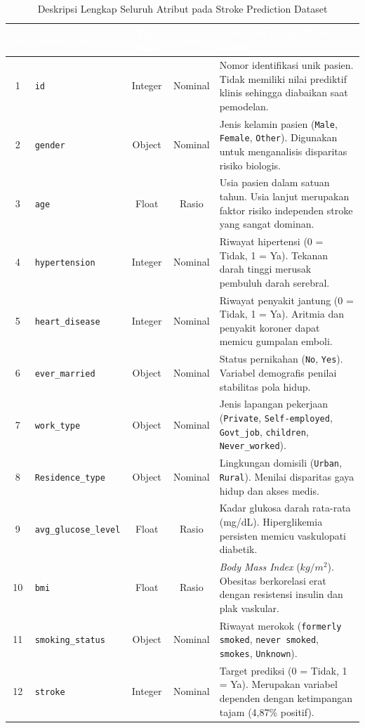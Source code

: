 \documentclass[a4paper,oneside,12pt]{report}
\newcommand{\thead}[1]{\textcolor{white}{\textbf{#1}}}
\begin{document}
\begin{table}[H]
\centering
\small
{}
\begin{tabularx}{\textwidth}{c l c c X}
\toprule
\rowcolor{tableheader}
\thead{No} & \thead{Nama Fitur} & \thead{Tipe Data} & \thead{Skala} & \thead{Deskripsi \& Signifikansi Klinis} \\
\midrule
1 & \texttt{id} & Integer & Nominal & Nomor identifikasi unik pasien. Tidak memiliki nilai prediktif klinis sehingga diabaikan saat pemodelan. \\
2 & \texttt{gender} & Object & Nominal & Jenis kelamin pasien (\texttt{Male}, \texttt{Female}, \texttt{Other}). Digunakan untuk menganalisis disparitas risiko biologis. \\
3 & \texttt{age} & Float & Rasio & Usia pasien dalam satuan tahun. Usia lanjut merupakan faktor risiko independen stroke yang sangat dominan. \\
4 & \texttt{hypertension} & Integer & Nominal & Riwayat hipertensi (0 = Tidak, 1 = Ya). Tekanan darah tinggi merusak pembuluh darah serebral. \\
5 & \texttt{heart\_disease} & Integer & Nominal & Riwayat penyakit jantung (0 = Tidak, 1 = Ya). Aritmia dan penyakit koroner dapat memicu gumpalan emboli. \\
6 & \texttt{ever\_married} & Object & Nominal & Status pernikahan (\texttt{No}, \texttt{Yes}). Variabel demografis penilai stabilitas pola hidup. \\
7 & \texttt{work\_type} & Object & Nominal & Jenis lapangan pekerjaan (\texttt{Private}, \texttt{Self-employed}, \texttt{Govt\_job}, \texttt{children}, \texttt{Never\_worked}). \\
8 & \texttt{Residence\_type} & Object & Nominal & Lingkungan domisili (\texttt{Urban}, \texttt{Rural}). Menilai disparitas gaya hidup dan akses medis. \\
9 & \texttt{avg\_glucose\_level} & Float & Rasio & Kadar glukosa darah rata-rata (mg/dL). Hiperglikemia persisten memicu vaskulopati diabetik. \\
10 & \texttt{bmi} & Float & Rasio & \textit{Body Mass Index} ($kg/m^2$). Obesitas berkorelasi erat dengan resistensi insulin dan plak vaskular. \\
11 & \texttt{smoking\_status} & Object & Nominal & Riwayat merokok (\texttt{formerly smoked}, \texttt{never smoked}, \texttt{smokes}, \texttt{Unknown}). \\
12 & \texttt{stroke} & Integer & Nominal & Target prediksi (0 = Tidak, 1 = Ya). Merupakan variabel dependen dengan ketimpangan tajam (4,87\% positif). \\
\bottomrule
\end{tabularx}
\caption{Deskripsi Lengkap Seluruh Atribut pada Stroke Prediction Dataset}
\label{tab:stroke-features}
\end{table}
\end{document}
